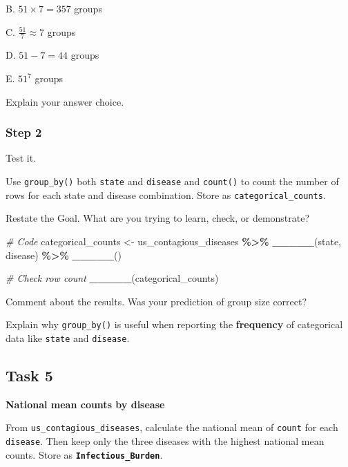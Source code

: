 \documentclass[
]{article}
\newenvironment{Shaded}{\begin{snugshade}}{\end{snugshade}}
\newcommand{\CommentTok}[1]{\textcolor[rgb]{0.56,0.35,0.01}{\textit{#1}}}
\newcommand{\FunctionTok}[1]{\textcolor[rgb]{0.13,0.29,0.53}{\textbf{#1}}}
\newcommand{\NormalTok}[1]{#1}
\newcommand{\OtherTok}[1]{\textcolor[rgb]{0.56,0.35,0.01}{#1}}
\newcommand{\SpecialCharTok}[1]{\textcolor[rgb]{0.81,0.36,0.00}{\textbf{#1}}}
\begin{document}
B. \(51 \times 7 = 357\) groups

C. \(\frac{51}{7} \approx 7\) groups

D. \(51 - 7 = 44\) groups

E. \(51^7\) groups

Explain your answer choice.

\subsubsection{Step 2}\label{step-2}

Test it.

Use \texttt{group\_by()} both \texttt{state} and \texttt{disease} and
\texttt{count()} to count the number of rows for each state and disease
combination. Store as \texttt{categorical\_counts}.

Restate the Goal. What are you trying to learn, check, or demonstrate?

\begin{Shaded}
\begin{Highlighting}[]
\CommentTok{\#  Code}
\NormalTok{categorical\_counts }\OtherTok{\textless{}{-}}\NormalTok{ us\_contagious\_diseases }\SpecialCharTok{\%\textgreater{}\%}
  \FunctionTok{\_\_\_\_\_}\NormalTok{(state, disease) }\SpecialCharTok{\%\textgreater{}\%}
  \FunctionTok{\_\_\_\_\_}\NormalTok{()}
\end{Highlighting}
\end{Shaded}

\begin{Shaded}
\begin{Highlighting}[]
\CommentTok{\#  Check row count}
\FunctionTok{\_\_\_\_\_}\NormalTok{(categorical\_counts) }
\end{Highlighting}
\end{Shaded}

Comment about the results. Was your prediction of group size correct?

Explain why \texttt{group\_by()} is useful when reporting the
\textbf{frequency} of categorical data like \texttt{state} and
\texttt{disease}.

\subsection{Task 5}\label{task-5}

\textbf{National mean counts by disease}

From \texttt{us\_contagious\_diseases}, calculate the national mean of
\texttt{count} for each \texttt{disease}. Then keep only the three
diseases with the highest national mean counts. Store as
\textbf{\texttt{Infectious\_Burden}}.
\end{document}
